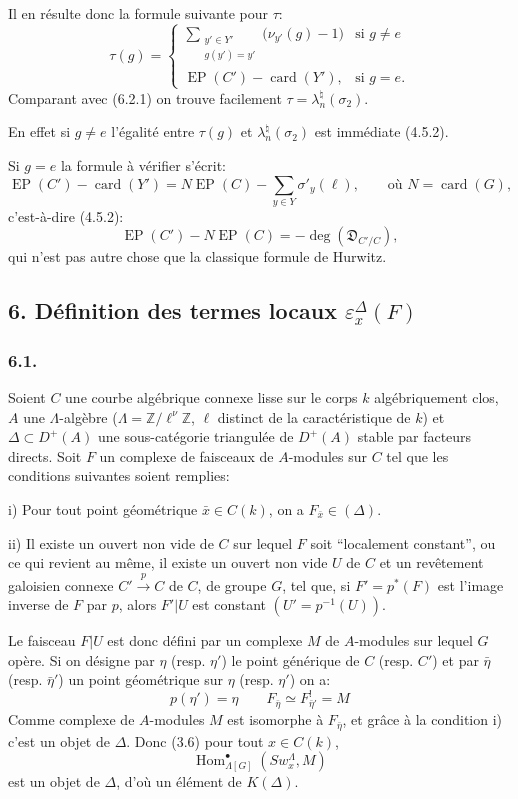 \documentclass[11pt]{article}
\DeclareMathOperator{\Hom}{Hom}
\providecommand{\EP}{\operatorname{EP}}
\providecommand{\Hom}{\operatorname{Hom}}
\providecommand{\EP}{\operatorname{EP}}
\providecommand{\Hom}{\operatorname{Hom}}
\begin{document}
Il en résulte donc la formule suivante pour $\tau$:
\[
\tau(g)=
\begin{cases}
\displaystyle\sum_{\substack{y'\in Y'\\g(y')=y'}}\bigl(\nu_{y'}(g)-1\bigr)& \text{si } g\ne e\\[0.8em]
\EP(C')-\operatorname{card}(Y'),& \text{si } g=e.
\end{cases}
\tag{5.2.2}
\]
Comparant avec (6.2.1) on trouve facilement $\tau=\lambda_n^\natural(\sigma_2)$.

En effet si $g\ne e$ l'égalité entre $\tau(g)$ et $\lambda_n^\natural(\sigma_2)$ est immédiate (4.5.2).

Si $g=e$ la formule à vérifier s'écrit:
\[
\EP(C')-\operatorname{card}(Y')
=
N\EP(C)-\sum_{y\in Y}\sigma'_y(\ell),
\qquad\text{où } N=\operatorname{card}(G),
\]
c'est-à-dire (4.5.2):
\[
\EP(C')-N\EP(C)=-\deg(\mathfrak D_{C'/C}),
\]
qui n'est pas autre chose que la classique formule de Hurwitz.

\subsection*{6. Définition des termes locaux $\varepsilon_x^\Delta(F)$}

\subsubsection*{6.1.}

Soient $C$ une courbe algébrique connexe lisse sur le corps $k$ algébriquement clos, $A$ une $\Lambda$-algèbre ($\Lambda=\mathbb Z/\ell^\nu\mathbb Z$, $\ell$ distinct de la caractéristique de $k$) et $\Delta\subset D^+(A)$ une sous-catégorie triangulée de $D^+(A)$ stable par facteurs directs. Soit $F$ un complexe de faisceaux de $A$-modules sur $C$ tel que les conditions suivantes soient remplies:

i) Pour tout point géométrique $\bar x\in C(k)$, on a $F_{\bar x}\in(\Delta)$.

ii) Il
existe un ouvert non vide de $C$ sur lequel $F$ soit ``localement constant'', ou ce qui revient au même, il existe un ouvert non vide $U$ de $C$ et un revêtement galoisien connexe $C'\xrightarrow{p}C$ de $C$, de groupe $G$, tel que, si $F'=p^*(F)$ est l'image inverse de $F$ par $p$, alors $F'|U$ est constant $(U'=p^{-1}(U))$.

Le faisceau $F|U$ est donc défini par un complexe $M$ de $A$-modules sur lequel $G$ opère. Si on désigne par $\eta$ (resp. $\eta'$) le point générique de $C$ (resp. $C'$) et par $\bar\eta$ (resp. $\bar\eta'$) un point géométrique sur $\eta$ (resp. $\eta'$) on a:
\[
p(\eta')=\eta\qquad
F_{\bar\eta}\simeq F^{!}_{\bar\eta'}=M
\tag{6.1.1}
\]
Comme complexe de $A$-modules $M$ est isomorphe à $F_{\bar\eta}$, et grâce à la condition i) c'est un objet de $\Delta$. Donc (3.6) pour tout $x\in C(k)$,
\[
\Hom^\bullet_{\Lambda[G]}(Sw_x^\Lambda,M)
\]
est un objet de $\Delta$, d'où un élément de $K(\Delta)$.
\end{document}
